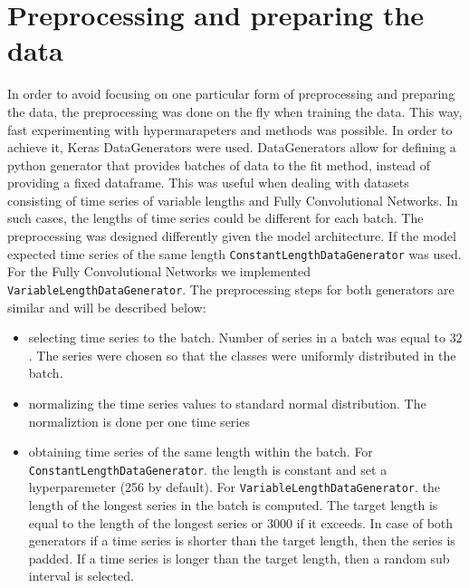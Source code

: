 \documentclass[a4paper,11pt,twoside]{report}
\theoremstyle{definition}
\begin{document}
\section{Preprocessing and preparing the data}
In order to avoid focusing on one particular form of preprocessing and preparing the data, the preprocessing was done on the fly when training the data. This way, fast experimenting with hypermarapeters and methods was possible. In order to achieve it, Keras DataGenerators were used. DataGenerators allow for defining a python generator that provides batches of data to the fit method, instead of providing a fixed dataframe. This was useful when dealing with datasets consisting of time series of variable lengths and Fully Convolutional Networks. In such cases, the lengths of time series could be different for each batch.
The preprocessing was designed differently given the model architecture. If the model expected time series of the same length \texttt{ConstantLengthDataGenerator} was used. For the Fully Convolutional Networks we implemented \texttt{VariableLengthDataGenerator}.
The preprocessing steps for both generators are similar and will be described below:
\begin{itemize}
	\item selecting time series to the batch. Number of series in a batch was equal to $32$. The series were chosen so that the classes were uniformly distributed in the batch.
	\item normalizing the time series values to standard normal distribution. The normaliztion is done per one time series
	\item obtaining time series of the same length within the batch. For \texttt{ConstantLengthDataGenerator}.
 the length is constant and set a hyperparemeter (256 by default). For \texttt{VariableLengthDataGenerator}.
the length of the longest series in the batch is computed. The target length is equal to the length of the longest series or $3000$ if it exceeds. In case of both generators if a time series is shorter than the target length, then the series is padded. If a time series is longer than the target length, then a random sub interval is selected.



\end{itemize}
\end{document}

